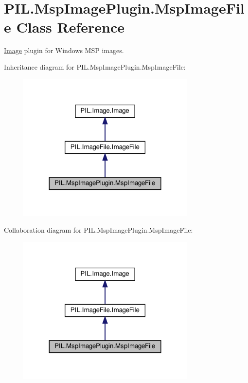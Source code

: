 \hypertarget{classPIL_1_1MspImagePlugin_1_1MspImageFile}{}\section{P\+I\+L.\+Msp\+Image\+Plugin.\+Msp\+Image\+File Class Reference}
\label{classPIL_1_1MspImagePlugin_1_1MspImageFile}


\hyperlink{namespacePIL_1_1Image}{Image} plugin for Windows M\+SP images.  




Inheritance diagram for P\+I\+L.\+Msp\+Image\+Plugin.\+Msp\+Image\+File\+:
\nopagebreak
\begin{figure}[H]
\begin{center}
\leavevmode
\includegraphics[width=252pt]{classPIL_1_1MspImagePlugin_1_1MspImageFile__inherit__graph}
\end{center}
\end{figure}


Collaboration diagram for P\+I\+L.\+Msp\+Image\+Plugin.\+Msp\+Image\+File\+:
\nopagebreak
\begin{figure}[H]
\begin{center}
\leavevmode
\includegraphics[width=252pt]{classPIL_1_1MspImagePlugin_1_1MspImageFile__coll__graph}
\end{center}
\end{figure}

